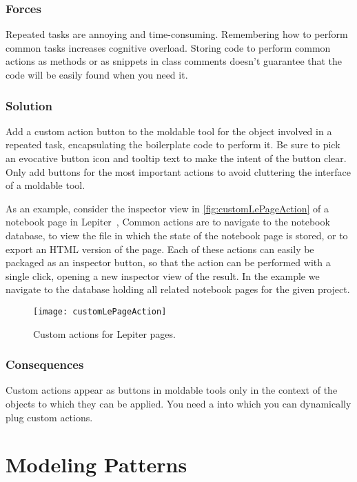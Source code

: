 \documentclass[sigconf]{acmart}
\renewcommand{\nbc}[3]{} %
\newcommand\kh[1]{\nbc{Konrad}{#1}{violet}}
\newcommand{\pattern}[1]{\emph{\nameref{pat:#1}}\xspace}
\begin{document}
\subsubsection*{Forces}
Repeated tasks are annoying and time-consuming.
Remembering how to perform common tasks increases cognitive overload.
Storing code to perform common actions as methods or as snippets in class comments doesn't guarantee that the code will be easily found when you need it.

\subsubsection*{Solution}
Add a custom action button to the moldable tool for the object involved in a repeated task, encapsulating the boilerplate code to perform it.
Be sure to pick an evocative button icon and tooltip text to make the intent of the button clear.
Only add buttons for the most important actions to avoid cluttering the interface of a moldable tool.

As an example, consider the inspector view in \autoref{fig:customLePageAction} of a notebook page in Lepiter~\cite{Girb21a}, 
Common actions are to navigate to the notebook database, to view the file in which the state of the notebook page is stored, or to export an HTML version of the page.
Each of these actions can easily be packaged as an inspector button, so that the action can be performed with a single click, opening a new inspector view of the result.
In the example we navigate to the database holding all related notebook pages for the given project.

\begin{figure}[h]
  \texttt{[image: customLePageAction]}
  \caption{Custom actions for Lepiter pages.}
  \label{fig:customLePageAction}
\end{figure}

\subsubsection*{Consequences}
Custom actions appear as buttons in moldable tools only in the context of the objects to which they can be applied.
You need a \pattern{moldableTool} into which you can dynamically plug custom actions.

\section{Modeling Patterns}\label{sec:modeling}
\end{document}
